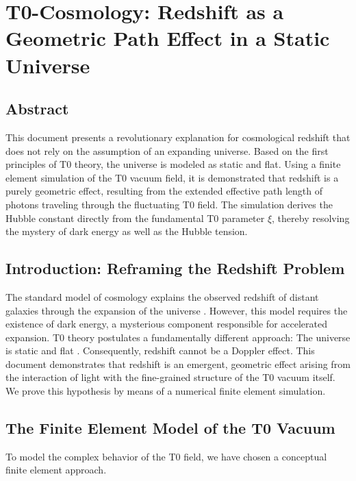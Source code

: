 	\chapter{T0-Cosmology: Redshift as a Geometric Path Effect in a Static Universe}
	\let\cleardoublepage\clearpage  %
	
	\allowdisplaybreaks
	
	\section*{Abstract}
	This document presents a revolutionary explanation for cosmological redshift that does not rely on the assumption of an expanding universe. Based on the first principles of T0 theory, the universe is modeled as static and flat. Using a finite element simulation of the T0 vacuum field, it is demonstrated that redshift is a purely geometric effect, resulting from the extended effective path length of photons traveling through the fluctuating T0 field. The simulation derives the Hubble constant directly from the fundamental T0 parameter $\xi$, thereby resolving the mystery of dark energy as well as the Hubble tension.
	
	\section{Introduction: Reframing the Redshift Problem}
	The standard model of cosmology explains the observed redshift of distant galaxies through the expansion of the universe \cite{planck2018}. However, this model requires the existence of dark energy, a mysterious component responsible for accelerated expansion. T0 theory postulates a fundamentally different approach: The universe is static and flat \cite{pascher:t0_foundations}. Consequently, redshift cannot be a Doppler effect.
	This document demonstrates that redshift is an emergent, geometric effect arising from the interaction of light with the fine-grained structure of the T0 vacuum itself. We prove this hypothesis by means of a numerical finite element simulation.
	\section{The Finite Element Model of the T0 Vacuum}
	To model the complex behavior of the T0 field, we have chosen a conceptual finite element approach.

